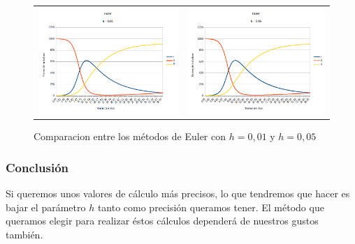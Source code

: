 \documentclass[11pt,a4paper]{report}
\begin{document}
\begin{figure}[H]
\begin{tabular}{ll}
\includegraphics[scale=0.25]{img/sin_inmunidad/euler-0-01.png}
&
\includegraphics[scale=0.25]{img/sin_inmunidad/euler-0-05.png}
\end{tabular}
\caption{Comparacion entre los métodos de Euler con $h = 0,01$ y $h = 0,05$}
\end{figure}

\subsubsection{Conclusión}

Si queremos unos valores de cálculo más precisos, lo que tendremos que hacer es bajar el parámetro $h$ tanto como precisión queramos tener. El método que queramos elegir para realizar éstos cálculos dependerá de nuestros gustos también.
\end{document}
